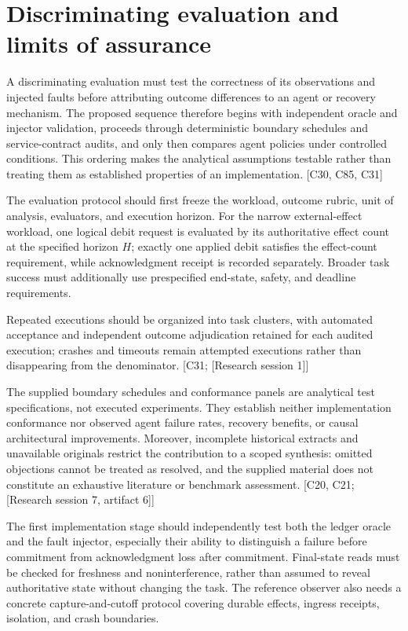 \documentclass[11pt]{article}
\begin{document}
\section{Discriminating evaluation and limits of assurance}
A discriminating evaluation must test the correctness of its observations and injected faults before attributing outcome differences to an agent or recovery mechanism. The proposed sequence therefore begins with independent oracle and injector validation, proceeds through deterministic boundary schedules and service-contract audits, and only then compares agent policies under controlled conditions. This ordering makes the analytical assumptions testable rather than treating them as established properties of an implementation. [C30, C85, C31]

The evaluation protocol should first freeze the workload, outcome rubric, unit of analysis, evaluators, and execution horizon. For the narrow external-effect workload, one logical debit request is evaluated by its authoritative effect count at the specified horizon $H$; exactly one applied debit satisfies the effect-count requirement, while acknowledgment receipt is recorded separately. Broader task success must additionally use prespecified end-state, safety, and deadline requirements.

Repeated executions should be organized into task clusters, with automated acceptance and independent outcome adjudication retained for each audited execution; crashes and timeouts remain attempted executions rather than disappearing from the denominator. [C31; [Research session 1]]

The supplied boundary schedules and conformance panels are analytical test specifications, not executed experiments. They establish neither implementation conformance nor observed agent failure rates, recovery benefits, or causal architectural improvements. Moreover, incomplete historical extracts and unavailable originals restrict the contribution to a scoped synthesis: omitted objections cannot be treated as resolved, and the supplied material does not constitute an exhaustive literature or benchmark assessment. [C20, C21; [Research session 7, artifact 6]]

The first implementation stage should independently test both the ledger oracle and the fault injector, especially their ability to distinguish a failure before commitment from acknowledgment loss after commitment. Final-state reads must be checked for freshness and noninterference, rather than assumed to reveal authoritative state without changing the task. The reference observer also needs a concrete capture-and-cutoff protocol covering durable effects, ingress receipts, isolation, and crash boundaries.
\end{document}
